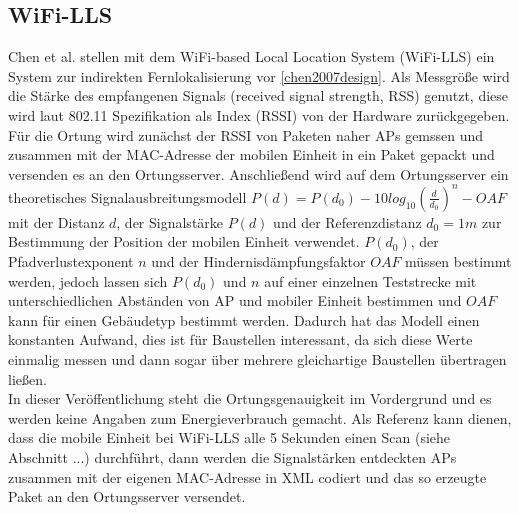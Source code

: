 \subsection{WiFi-LLS}
\label{ch:Vorherige:sec:LLS}
Chen et al. stellen mit dem WiFi-based Local Location System (WiFi-LLS) ein System zur indirekten Fernlokalisierung vor \ref{chen2007design}.
Als Messgröße wird die Stärke des empfangenen Signals (received signal strength, RSS) genutzt, diese wird laut 802.11 Spezifikation als Index (RSSI) von der Hardware zurückgegeben. \\
Für die Ortung wird zunächst der RSSI von Paketen naher APs gemssen und zusammen mit der MAC-Adresse der mobilen Einheit in ein Paket gepackt und versenden es an den Ortungsserver.
Anschließend wird auf dem Ortungsserver ein theoretisches Signalausbreitungsmodell $P(d) = P(d_0) - 10log_{10}(\frac{d}{d_0})^n - OAF$ mit der Distanz $d$, der Signalstärke $P(d)$ und der Referenzdistanz $d_0 = 1m$ zur Bestimmung der Position der mobilen Einheit verwendet. 
$P(d_0)$, der Pfadverlustexponent $n$ und der Hindernisdämpfungsfaktor $OAF$ müssen bestimmt werden, jedoch lassen sich $P(d_0)$ und $n$ auf einer einzelnen Teststrecke mit unterschiedlichen Abständen von AP und mobiler Einheit bestimmen und $OAF$ kann für einen Gebäudetyp bestimmt werden.
Dadurch hat das Modell einen konstanten Aufwand, dies ist für Baustellen interessant, da sich diese Werte einmalig messen und dann sogar über mehrere gleichartige Baustellen übertragen ließen.\\
In dieser Veröffentlichung steht die Ortungsgenauigkeit im Vordergrund und es werden keine Angaben zum Energieverbrauch gemacht. 
Als Referenz kann dienen, dass die mobile Einheit bei WiFi-LLS alle 5 Sekunden einen Scan (siehe Abschnitt ...) durchführt, dann werden die Signalstärken entdeckten APs zusammen mit der eigenen MAC-Adresse in XML codiert und das so erzeugte Paket an den Ortungsserver versendet.

